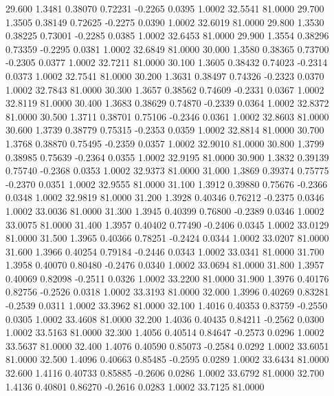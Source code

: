  29.600   1.3481   0.38070   0.72231  -0.2265   0.0395   1.0002  32.5541  81.0000
  29.700   1.3505   0.38149   0.72625  -0.2275   0.0390   1.0002  32.6019  81.0000
  29.800   1.3530   0.38225   0.73001  -0.2285   0.0385   1.0002  32.6453  81.0000
  29.900   1.3554   0.38296   0.73359  -0.2295   0.0381   1.0002  32.6849  81.0000
  30.000   1.3580   0.38365   0.73700  -0.2305   0.0377   1.0002  32.7211  81.0000
  30.100   1.3605   0.38432   0.74023  -0.2314   0.0373   1.0002  32.7541  81.0000
  30.200   1.3631   0.38497   0.74326  -0.2323   0.0370   1.0002  32.7843  81.0000
  30.300   1.3657   0.38562   0.74609  -0.2331   0.0367   1.0002  32.8119  81.0000
  30.400   1.3683   0.38629   0.74870  -0.2339   0.0364   1.0002  32.8372  81.0000
  30.500   1.3711   0.38701   0.75106  -0.2346   0.0361   1.0002  32.8603  81.0000
  30.600   1.3739   0.38779   0.75315  -0.2353   0.0359   1.0002  32.8814  81.0000
  30.700   1.3768   0.38870   0.75495  -0.2359   0.0357   1.0002  32.9010  81.0000
  30.800   1.3799   0.38985   0.75639  -0.2364   0.0355   1.0002  32.9195  81.0000
  30.900   1.3832   0.39139   0.75740  -0.2368   0.0353   1.0002  32.9373  81.0000
  31.000   1.3869   0.39374   0.75775  -0.2370   0.0351   1.0002  32.9555  81.0000
  31.100   1.3912   0.39880   0.75676  -0.2366   0.0348   1.0002  32.9819  81.0000
  31.200   1.3928   0.40346   0.76212  -0.2375   0.0346   1.0002  33.0036  81.0000
  31.300   1.3945   0.40399   0.76800  -0.2389   0.0346   1.0002  33.0075  81.0000
  31.400   1.3957   0.40402   0.77490  -0.2406   0.0345   1.0002  33.0129  81.0000
  31.500   1.3965   0.40366   0.78251  -0.2424   0.0344   1.0002  33.0207  81.0000
  31.600   1.3966   0.40254   0.79184  -0.2446   0.0343   1.0002  33.0341  81.0000
  31.700   1.3958   0.40070   0.80480  -0.2476   0.0340   1.0002  33.0694  81.0000
  31.800   1.3957   0.40069   0.82098  -0.2511   0.0326   1.0002  33.2200  81.0000
  31.900   1.3976   0.40176   0.82756  -0.2526   0.0318   1.0002  33.3193  81.0000
  32.000   1.3996   0.40269   0.83281  -0.2539   0.0311   1.0002  33.3962  81.0000
  32.100   1.4016   0.40353   0.83759  -0.2550   0.0305   1.0002  33.4608  81.0000
  32.200   1.4036   0.40435   0.84211  -0.2562   0.0300   1.0002  33.5163  81.0000
  32.300   1.4056   0.40514   0.84647  -0.2573   0.0296   1.0002  33.5637  81.0000
  32.400   1.4076   0.40590   0.85073  -0.2584   0.0292   1.0002  33.6051  81.0000
  32.500   1.4096   0.40663   0.85485  -0.2595   0.0289   1.0002  33.6434  81.0000
  32.600   1.4116   0.40733   0.85885  -0.2606   0.0286   1.0002  33.6792  81.0000
  32.700   1.4136   0.40801   0.86270  -0.2616   0.0283   1.0002  33.7125  81.0000
